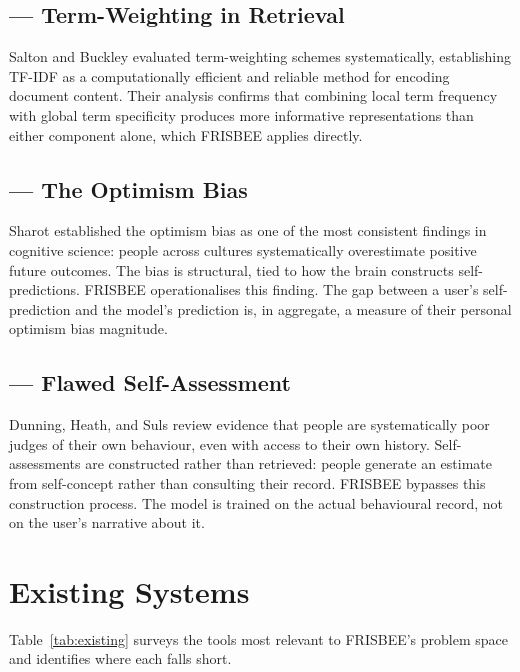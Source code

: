 \documentclass[11pt, a4paper]{report}
\begin{document}
\subsection{\citet{salton1988} --- Term-Weighting in Retrieval}

Salton and Buckley evaluated term-weighting schemes systematically,
establishing TF-IDF as a computationally efficient and reliable method for
encoding document content. Their analysis confirms that combining local
term frequency with global term specificity produces more informative
representations than either component alone, which FRISBEE applies directly.

\subsection{\citet{sharot2011} --- The Optimism Bias}

Sharot established the optimism bias as one of the most consistent findings
in cognitive science: people across cultures systematically overestimate
positive future outcomes. The bias is structural, tied to how the brain
constructs self-predictions. FRISBEE operationalises this finding. The gap
between a user's self-prediction and the model's prediction is, in aggregate,
a measure of their personal optimism bias magnitude.

\subsection{\citet{dunning2004} --- Flawed Self-Assessment}

Dunning, Heath, and Suls review evidence that people are systematically poor
judges of their own behaviour, even with access to their own history.
Self-assessments are constructed rather than retrieved: people generate an
estimate from self-concept rather than consulting their record. FRISBEE
bypasses this construction process. The model is trained on the actual
behavioural record, not on the user's narrative about it.

\section{Existing Systems}

Table~\ref{tab:existing} surveys the tools most relevant to FRISBEE's
problem space and identifies where each falls short.
\end{document}
